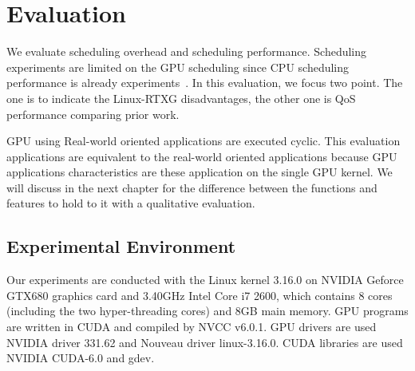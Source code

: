 \section{Evaluation}\label{sec:evaluation}
We evaluate scheduling overhead and scheduling performance.
Scheduling experiments are limited on the GPU scheduling since CPU scheduling performance is already experiments~\cite{kato:resch}.
In this evaluation, we focus two point.
The one is to indicate the Linux-RTXG disadvantages,
the other one is QoS performance comparing prior work. 


GPU using Real-world oriented applications\cite{hirabayashi:cpsna2013,tokamak} are executed cyclic.
This evaluation applications are equivalent to the real-world oriented applications
because GPU applications characteristics are these application on the single GPU kernel.
We will discuss in the next chapter for the difference between the functions and features to hold to it with a qualitative evaluation.



\subsection{Experimental Environment}
Our experiments are conducted with the Linux kernel 3.16.0 on NVIDIA Geforce GTX680 graphics card and 3.40GHz Intel Core i7 2600, which contains 8 cores (including the two hyper-threading cores) and 8GB main memory.
GPU programs are written in CUDA and compiled by NVCC v6.0.1.
GPU drivers are used NVIDIA driver 331.62 and Nouveau driver linux-3.16.0.
CUDA libraries are used NVIDIA CUDA-6.0 and gdev.

